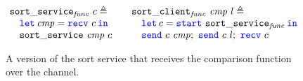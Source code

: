 \newcommand{\sendfuncfig}{
\begin{figure}
\begin{equation*}
\begin{array}{@{}l@{\qquad}l@{}}
\begin{array}[t]{@{}l@{}}
  \listsortcmpservicename\ \chan \eqdef \\
  \quad \Let \cmpvar = \recv \chan in\\
  \quad \listsortservicename\ \cmpvar\ \chan
\end{array}
&
\begin{array}[t]{@{}l@{}}
  \listsortcmpclientname\ \cmpvar\ l \eqdef \\
  \quad
  \Let \chan = \start\listsortcmpservicename in\\
  \quad
  \send \chan \cmpvar;\
  \send \chan l;\ \recv \chan
\end{array}
\end{array}
\end{equation*}
\caption{A version of the sort service that receives the comparison function
over the channel.}
\label{fig:sendFunction}
\end{figure}}

\sendfuncfig

